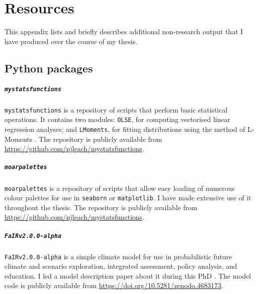 \chapter{\label{resources}Resources}

This appendix lists and briefly describes additional non-research output that I have produced over the course of my thesis.

\section{Python packages}

  \paragraph*{\texttt{mystatsfunctions}}
    
    \texttt{mystatsfunctions} is a repository of scripts that perform basic statistical operations. It contains two modules: \texttt{OLSE}, for computing vectorised linear regression analyses; and \texttt{LMoments}, for fitting distributions using the method of L-Moments \citep{hosking_estimation_1985,hosking_parameter_1987,hosking_l-moments_1990,hosking_regional_1997}. The repository is publicly available from \url{https://github.com/njleach/mystatsfunctions}.

  \paragraph*{\texttt{moarpalettes}}
    
    \texttt{moarpalettes} is a repository of scripts that allow easy loading of numerous colour palettes for use in \texttt{seaborn} or \texttt{matplotlib}. I have made extensive use of it throughout the thesis. The repository is publicly available from \url{https://github.com/njleach/mystatsfunctions}.

  \paragraph*{\texttt{FaIRv2.0.0-alpha}}
    
    \texttt{FaIRv2.0.0-alpha} is a simple climate model for use in probabilistic future climate and scenario exploration, integrated assessment, policy analysis, and education. I led a model description paper about it during this PhD \citep{leach_fairv200_2021}. The model code is publicly available from \url{https://doi.org/10.5281/zenodo.4683173}.

